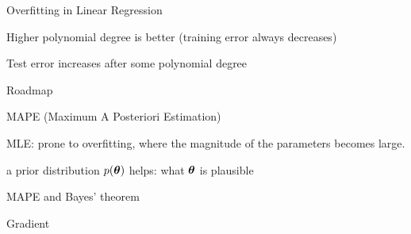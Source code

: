 \documentclass[handout,fleqn,aspectratio=169]{beamer}
\begin{document}
\begin{frame}{Overfitting in Linear Regression}

{
\vspace{-0.4cm}
}
{
}


\plitemsep 0.04in

\bci 

\item Higher polynomial degree is better (training error always decreases)

\item Test error increases after some polynomial degree
\eci
\end{frame}

\begin{frame}{Roadmap}

\plitemsep 0.1in

\bci 

\item  {}
\item  {} 
\item  {} 
\item  {}

\eci
\end{frame}


\begin{frame}{MAPE (Maximum A Posteriori Estimation)}

\plitemsep 0.15in

\bci 

\item MLE: prone to overfitting, where the magnitude of the parameters becomes large.
\item a prior distribution $p(\bm{\theta})$ helps: what $\bm{\theta}$ is plausible 
\item MAPE and Bayes' theorem
\item Gradient

\eci

\end{frame}
\end{document}
